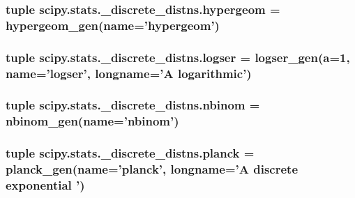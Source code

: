 \subsubsection[{hypergeom}]{\setlength{\rightskip}{0pt plus 5cm}tuple scipy.\+stats.\+\_\+discrete\+\_\+distns.\+hypergeom = {\bf hypergeom\+\_\+gen}(name='hypergeom')}\label{namespacescipy_1_1stats_1_1__discrete__distns_a384e86a8b065ea9cc1322478d4a068a0}
\hypertarget{namespacescipy_1_1stats_1_1__discrete__distns_af613f1861a67fd27e3756607b634b14c}{}
\subsubsection[{logser}]{\setlength{\rightskip}{0pt plus 5cm}tuple scipy.\+stats.\+\_\+discrete\+\_\+distns.\+logser = {\bf logser\+\_\+gen}({\bf a}=1, name='logser', longname='{\bf A} logarithmic')}\label{namespacescipy_1_1stats_1_1__discrete__distns_af613f1861a67fd27e3756607b634b14c}
\hypertarget{namespacescipy_1_1stats_1_1__discrete__distns_ac175f9326ae4fa63deeecff2c2c58c2f}{}
\subsubsection[{nbinom}]{\setlength{\rightskip}{0pt plus 5cm}tuple scipy.\+stats.\+\_\+discrete\+\_\+distns.\+nbinom = {\bf nbinom\+\_\+gen}(name='nbinom')}\label{namespacescipy_1_1stats_1_1__discrete__distns_ac175f9326ae4fa63deeecff2c2c58c2f}
\hypertarget{namespacescipy_1_1stats_1_1__discrete__distns_a22944d92d65c23a30d43cf5267c1b3b8}{}
\subsubsection[{planck}]{\setlength{\rightskip}{0pt plus 5cm}tuple scipy.\+stats.\+\_\+discrete\+\_\+distns.\+planck = {\bf planck\+\_\+gen}(name='planck', longname='{\bf A} discrete exponential ')}\label{namespacescipy_1_1stats_1_1__discrete__distns_a22944d92d65c23a30d43cf5267c1b3b8}
\hypertarget{namespacescipy_1_1stats_1_1__discrete__distns_aee3aa8ef9c359a2799da8d13cc7660ed}{}
